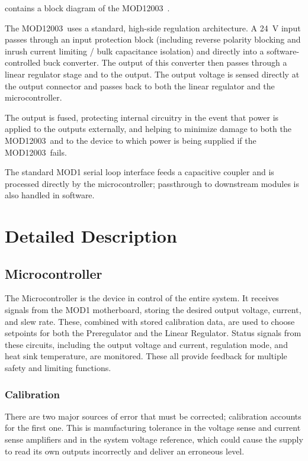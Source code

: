 \documentclass[letterpaper,twocolumn,10pt,openany,oneside,final,fleqn]{memoir}
\newcommand{\Model}{MOD12003\ }
\begin{document}
 contains a block diagram of the \Model.

The \Model uses a standard, high-side regulation architecture. A \SI{24}{V} input
passes through an input protection block (including reverse polarity blocking and
inrush current limiting / bulk capacitance isolation) and directly into a software-controlled
buck converter. The output of this converter then passes through a linear regulator
stage and to the output. The output voltage is sensed directly at the output connector
and passes back to both the linear regulator and the microcontroller.

The output is fused, protecting internal circuitry in the event that power
is applied to the outputs externally, and helping to minimize damage to both the
\Model and to the device to which power is being supplied if the \Model fails.

The standard MOD1 serial loop interface feeds a capacitive coupler and is
processed directly by the microcontroller; passthrough to downstream modules is
also handled in software.

\section{Detailed Description}

\subsection{Microcontroller}

The Microcontroller is the device in control of the entire system. It receives signals
from the MOD1 motherboard, storing the desired output voltage, current, and slew rate.
These, combined with stored calibration data, are used to choose setpoints for both the
Preregulator and the Linear Regulator. Status signals from these circuits, including
the output voltage and current, regulation mode, and heat sink temperature, are monitored.
These all provide feedback for multiple safety and limiting functions.

\subsubsection{Calibration}

There are two major sources of error that must be corrected; calibration accounts for the
first one. This is manufacturing tolerance in the voltage sense and current sense amplifiers
and in the system voltage reference, which could cause the supply to read its own outputs
incorrectly and deliver an erroneous level.
\end{document}
